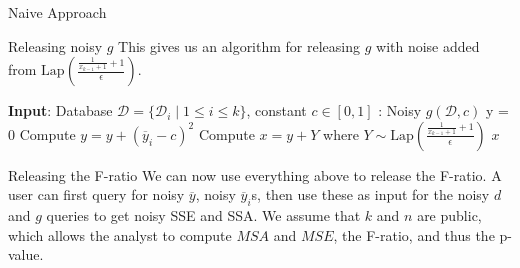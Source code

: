 \documentclass[11pt]{article}
\begin{document}
\begin{section}{Naive Approach}
\begin{subsection}{Releasing noisy $g$}
This gives us an algorithm for releasing $g$ with noise added from 
$\text{Lap}\left(\frac{\frac{1}{x_{k-1} + 1}+1}{\epsilon}\right)$.  

\begin{algorithm}
  \caption{}
  \label{alg-label}
  \begin{algorithmic}
    \STATE \textbf{Input}: Database $\mathcal{D} = \{\mathcal{D}_i \; |\; 
    1\leq i \leq k \}$, constant $c\in [0,1]$
    \STATE {}: Noisy $g(\mathcal{D},c)$
    \STATE y = 0
        \STATE Compute $y = y + (\overline{y}_i - c)^2$
      \ENDFOR
    \ENDFOR
    \STATE Compute $x = y + Y$ where 
     $Y\sim\text{Lap}\left(\frac{\frac{1}{x_{k-1} + 1}+1}{\epsilon}\right)$
    \RETURN $x$
  \end{algorithmic}
\end{algorithm}


\end{subsection}

\begin{subsection}{Releasing the F-ratio}
We can now use everything above to release the F-ratio. A user can first 
query for noisy $\overline{y}$, noisy $\overline{y}_i$s, then use these 
as input for the noisy $d$ and $g$ queries to get noisy SSE and SSA. 
We assume that $k$ and $n$ are public, which allows the analyst to compute $MSA$ and $MSE$, the 
F-ratio, and thus the p-value.
\end{subsection}

\end{section}
\end{document}
